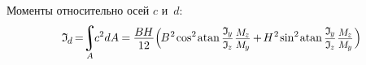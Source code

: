 \documentclass[14pt]{extarticle}
\DeclareMathOperator*{\integral}{\scalerel*{\rotatebox{12}{$\!\textstyle\int\!$}}{\int}} %
\newcommand\cosine{\operatorname{cos}}
\newcommand\sine{\operatorname{sin}}
\newcommand\atan{\operatorname{atan}}
\begin{document}
Моменты относительно осей $c$ и~$d$:
\[\begin{gathered}
\mathfrak{I}_{\hspace{-0.1ex}\scalebox{.8}{$d$}} \hspace{-0.25ex}
=\hspace{-0.6ex}
\integral_{A} \hspace{-0.7ex} c^2 dA \hspace{-0.1ex}
=\hspace{-0.1ex} \displaystyle\frac{\raisebox{-0.18em}{$B \hspace{-0.1ex} H$}}{12}
\Bigl(
\hspace{-0.2ex}
B^{\hspace{.1ex}2} \hspace{-.2ex} \cosine^{2} \hspace{-0.22ex} \atan \scalebox{.88}{$ \displaystyle\frac{\mathfrak{I}_{\hspace{-0.1ex}\scalebox{.8}{$y$}}}{\mathfrak{I}_{\hspace{-0.1ex}\scalebox{.8}{$z$}}} \hspace{.2ex}
\displaystyle\frac{\raisebox{-0.12em}{$M_{\hspace{-0.1ex}\scalebox{.8}{$z$}}$}}{M_{\hspace{-0.1ex}\scalebox{.8}{$y$}}} $}
\hspace{-0.1ex}+\hspace{-0.25ex}
H^{\hspace{.1ex}2} \hspace{-.2ex} \sine^{2} \hspace{-0.22ex} \atan \scalebox{.88}{$ \displaystyle\frac{\mathfrak{I}_{\hspace{-0.1ex}\scalebox{.8}{$y$}}}{\mathfrak{I}_{\hspace{-0.1ex}\scalebox{.8}{$z$}}} \hspace{.2ex}
\displaystyle\frac{\raisebox{-0.12em}{$M_{\hspace{-0.1ex}\scalebox{.8}{$z$}}$}}{M_{\hspace{-0.1ex}\scalebox{.8}{$y$}}} $} \hspace{.2ex}
\Bigr)
\end{gathered}\]
\end{document}
